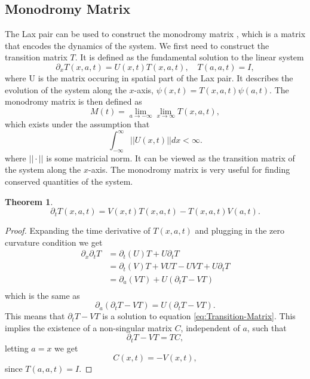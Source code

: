\documentclass[english,master]{liumaiex}
\theoremstyle{plain}
\newtheorem{theorem}[proposition]{Theorem}
\theoremstyle{definition}
\begin{document}
\subsection*{Monodromy Matrix}
The Lax pair can be used to construct the monodromy matrix \cite{Avendano2008,Krishnaswami_2021}, which is a matrix that encodes the dynamics of the system. We first need to construct the transition matrix $T$. It is defined as the fundamental solution to the linear system
\begin{equation}
	\partial_x T(x,a,t) = U(x,t) T(x,a,t), \quad T(a,a,t) = I,
\end{equation}
where U is the matrix occuring in spatial part of the Lax pair. It describes the evolution of the system along the $x$-axis, $\psi(x,t) = T(x,a,t) \psi(a, t)$. The monodromy matrix is then defined as
\begin{equation}
	M(t) =
		\lim_{a \rightarrow -\infty} \lim_{x \rightarrow \infty} T(x,a,t),
\end{equation}
which exists under the assumption that
\begin{equation}
	\int_{-\infty}^{\infty} ||U(x,t)|| dx < \infty.
\end{equation}
where $||\cdot||$ is some matricial norm. It can be viewed as the transition matrix of the system along the $x$-axis. The monodromy matrix is very useful for finding conserved quantities of the system.
\begin{theorem}
	\begin{equation} \label{eq:Transition-Matrix}
		\partial_t T(x,a,t) = V(x,t) T(x,a,t) - T(x,a,t) V(a,t).
	\end{equation}
\end{theorem}
\begin{proof}
	Expanding the time derivative of $T(x,a,t)$ and plugging in the zero curvature condition we get
	\begin{equation}
	\begin{aligned}
		\partial_x \partial_t T
			&= \partial_t (U) T + U \partial_t T \\
			&= \partial_t (V)T + VUT - UVT + U \partial_t T \\
			&= \partial_a (VT) + U(\partial_t T - VT) \\
	\end{aligned}
	\end{equation}
	which is the same as
	\begin{equation}
		\partial_a (\partial_t T - VT) = U(\partial_t T - VT).
	\end{equation}
	This means that $\partial_t T - VT$ is a solution to equation \eqref{eq:Transition-Matrix}.
	This implies the existence of a non-singular matrix $C$, independent of $a$, such that
	\begin{equation}
		\partial_t T - VT = TC,
	\end{equation}
	letting $a = x$ we get
	\begin{equation}
		C(x,t) = -V(x,t),
	\end{equation}
	since $T(a,a,t) = I$.
\end{proof}
\end{document}
